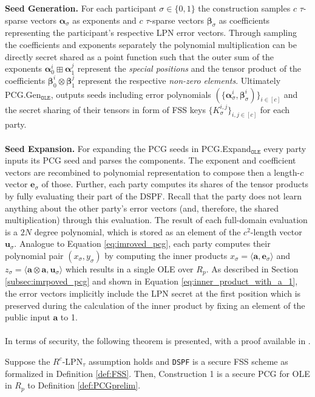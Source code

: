 \textbf{Seed Generation.} For each participant $\sigma \in \{0,1\}$ the construction samples $c$ $\tau$-sparse vectors $\boldsymbol{\alpha}_\sigma$ as exponents and $c$ $\tau$-sparse vectors $\boldsymbol{\beta}_\sigma$ as coefficients representing the participant's respective LPN error vectors. Through sampling the coefficients and exponents separately the polynomial multiplication can be directly secret shared as a point function such that the outer sum of the exponents $\boldsymbol{\alpha}_{0}^{i} \boxplus \boldsymbol{\alpha}_{1}^{j}$ represent the \textit{special positions} and the tensor product of the coefficients $\boldsymbol{\beta}_{0}^{i} \otimes \boldsymbol{\beta}_{1}^{j}$ represent the respective \textit{non-zero elements}. Ultimately PCG.Gen$_{\texttt{OLE}}$, outputs seeds including error polynomials $(\{\boldsymbol{\alpha}_\sigma^i, \boldsymbol{\beta}_\sigma^i)\}_{i\in[c]}$ and the secret sharing of their tensors in form of FSS keys $\{K_\sigma^{i,j}\}_{i,j\in[c]}$  for each party. 
\\\\
\textbf{Seed Expansion.}
For expanding the PCG seeds in PCG.Expand$_{\texttt{OLE}}$ every party inputs its PCG seed and parses the components. The exponent and coefficient vectors are recombined to polynomial representation to compose then a length-$c$ vector $\boldsymbol{e}_\sigma$ of those. Further, each party computes its shares of the tensor products by fully evaluating their part of the DSPF. Recall that the party does not learn anything about the other party's error vectors (and, therefore, the shared multiplication) through this evaluation. The result of each full-domain evaluation is a $2N$ degree polynomial, which is stored as an element of the $c^2$-length vector $\boldsymbol{u}_\sigma$. Analogue to Equation \ref{eq:imroved_pcg}, each party computes their polynomial pair $(x_\sigma , y_\sigma)$ by computing the inner products $x_\sigma = \langle\boldsymbol{a},\boldsymbol{e}_\sigma\rangle$ and $z_\sigma = \langle\boldsymbol{a}\otimes\boldsymbol{a},\boldsymbol{u}_\sigma\rangle$ which results in a single OLE over $R_p$. As described in Section \ref{subsec:imrpoved_pcg} and shown in Equation \ref{eq:inner_product_with_a_1}, the error vectors implicitly include the LPN secret at the first position which is preserved during the calculation of the inner product by fixing an element of the public input $\boldsymbol{a}$ to 1. 
\\\\
In terms of security, the following theorem is presented, with a proof available in \cite{boyle2020efficient}.
\begin{theorem}
Suppose the $R^c$-LPN$_\tau$ assumption holds and \texttt{DSPF} is a secure FSS scheme as formalized in Definition \ref{def:FSS}. Then, Construction 1 is a secure PCG for OLE in $R_p$ to Definition \ref{def:PCGprelim}.
\label{theorem:olepcg}
\end{theorem}

